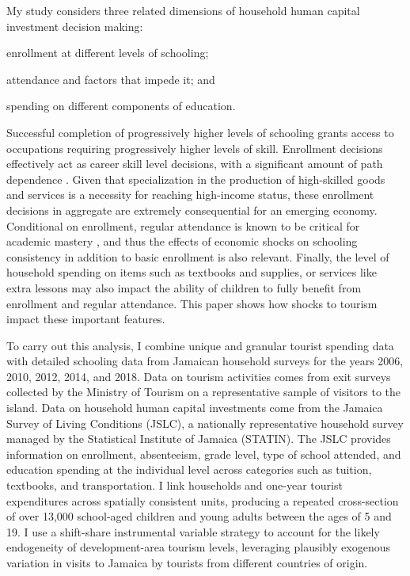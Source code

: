 \documentclass[12pt]{article}
\renewcommand\footnotesize{\fontsize{11}{13}\selectfont}
\begin{document}
	My study considers three related dimensions of household human capital investment decision making:
%
	\begin{enumerate*}[label=\arabic*)]
		\item enrollment at different levels of schooling;
		\item attendance and factors that impede it; and
		\item spending on different components of education.
	\end{enumerate*}
		Successful completion of progressively higher levels of schooling grants access to occupations requiring progressively higher levels of skill. Enrollment decisions effectively act as career skill level decisions, with a significant amount of path dependence \parencite{carrillo_present_2020}. Given that specialization in the production of high-skilled goods and services is a necessity for reaching high-income status, these enrollment decisions in aggregate are extremely consequential for an emerging economy. Conditional on enrollment, regular attendance is known to be critical for academic mastery \parencite{ gershenson_are_2017}, and thus the effects of economic shocks on schooling consistency in addition to basic enrollment is also relevant. Finally, the level of household spending on items such as textbooks and supplies, or services like extra lessons may also impact the ability of children to fully benefit from enrollment and regular attendance. This paper shows how shocks to tourism impact these important features. 
	 
	
	
	 To carry out this analysis, I combine unique and granular tourist spending data with detailed schooling data from Jamaican household surveys for the years 2006, 2010, 2012, 2014, and 2018. Data on tourism activities comes from exit surveys collected by the Ministry of Tourism on a representative sample of visitors to the island. Data on household human capital investments come from the Jamaica Survey of Living Conditions (JSLC), a nationally representative household survey managed by the Statistical Institute of Jamaica (STATIN). The JSLC provides information on enrollment, absenteeism, grade level, type of school attended, and education spending at the individual level across categories such as tuition, textbooks, and transportation. I link households and one-year  tourist expenditures across spatially consistent units, producing a repeated cross-section of over 13,000 school-aged children and young adults between the ages of 5 and 19. I use a shift-share instrumental variable strategy to account for the likely endogeneity of development-area tourism levels, leveraging plausibly exogenous variation in visits to Jamaica by tourists from different countries of origin. 
	 
\end{document}
